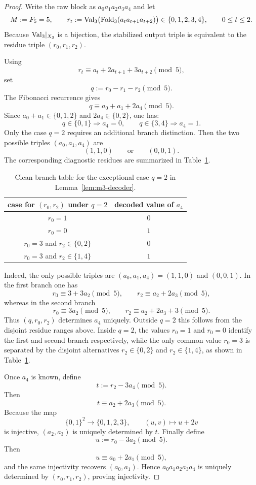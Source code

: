 \begin{proof}
Write the raw block as $a_0a_1a_2a_3a_4$ and let
\[
M:=F_5=5,
\qquad
r_t:=\mathrm{Val}_3\bigl(\mathrm{Fold}_3(a_ta_{t+1}a_{t+2})\bigr)\in\{0,1,2,3,4\},
\qquad 0\le t\le 2.
\]
Because $\mathrm{Val}_3|_{X_3}$ is a bijection, the stabilized output triple is
equivalent to the residue triple $(r_0,r_1,r_2)$.

Using
\[
r_t\equiv a_t+2a_{t+1}+3a_{t+2}\pmod 5,
\]
set
\[
q:=r_0-r_1-r_2\pmod 5.
\]
The Fibonacci recurrence gives
\[
q\equiv a_0+a_1+2a_4\pmod 5.
\]
Since $a_0+a_1\in\{0,1,2\}$ and $2a_4\in\{0,2\}$, one has:
\[
q\in\{0,1\}\Longrightarrow a_4=0,
\qquad
q\in\{3,4\}\Longrightarrow a_4=1.
\]
Only the case $q=2$ requires an additional branch distinction. Then the two
possible triples $(a_0,a_1,a_4)$ are
\[
(1,1,0)\qquad\text{or}\qquad (0,0,1).
\]
The corresponding diagnostic residues are summarized in
Table~\ref{tab:m3-decoder}.

\begin{table}[t]
\centering
\caption{Clean branch table for the exceptional case $q=2$ in Lemma~\ref{lem:m3-decoder}.}
\label{tab:m3-decoder}
\begin{tabular}{cc}
\toprule
case for $(r_0,r_2)$ under $q=2$ & decoded value of $a_4$ \\
\midrule
$r_0=1$ & $0$ \\
$r_0=0$ & $1$ \\
$r_0=3$ and $r_2\in\{0,2\}$ & $0$ \\
$r_0=3$ and $r_2\in\{1,4\}$ & $1$ \\
\bottomrule
\end{tabular}
\end{table}

Indeed, the only possible triples are $(a_0,a_1,a_4)=(1,1,0)$ and
$(0,0,1)$. In the first branch one has
\[
r_0\equiv 3+3a_2\pmod 5,
\qquad
r_2\equiv a_2+2a_3\pmod 5,
\]
whereas in the second branch
\[
r_0\equiv 3a_2\pmod 5,
\qquad
r_2\equiv a_2+2a_3+3\pmod 5.
\]
Thus $(q,r_0,r_2)$ determines $a_4$ uniquely. Outside $q=2$ this follows from
the disjoint residue ranges above. Inside $q=2$, the values $r_0=1$ and
$r_0=0$ identify the first and second branch respectively, while the only
common value $r_0=3$ is separated by the disjoint alternatives
$r_2\in\{0,2\}$ and $r_2\in\{1,4\}$, as shown in
Table~\ref{tab:m3-decoder}.

Once $a_4$ is known, define
\[
t:=r_2-3a_4\pmod 5.
\]
Then
\[
t\equiv a_2+2a_3\pmod 5.
\]
Because the map
\[
\{0,1\}^2\to\{0,1,2,3\},\qquad (u,v)\mapsto u+2v
\]
is injective, $(a_2,a_3)$ is uniquely determined by $t$. Finally define
\[
u:=r_0-3a_2\pmod 5.
\]
Then
\[
u\equiv a_0+2a_1\pmod 5,
\]
and the same injectivity recovers $(a_0,a_1)$. Hence
$a_0a_1a_2a_3a_4$ is uniquely determined by $(r_0,r_1,r_2)$, proving
injectivity.
\end{proof}

